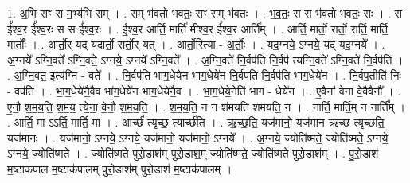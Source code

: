 \documentclass[17pt]{extarticle}
\begin{document}
1. अ॒भि सꣳ स म॒भ्य॑भि सम् । . सम् भ॑वतो भवतः॒ सꣳ सम् भ॑वतः । . भ॒व॒तः॒ स स भ॑वतो भवतः॒ सः । . स ई᳚श्व॒र ई᳚श्व॒रः स स ई᳚श्व॒रः । . ई॒श्व॒र आर्ति॒ मार्ति॑ मीश्व॒र ई᳚श्व॒र आर्ति᳚म् । . आर्ति॒ मार्तो॒ रार्तो॒ रार्ति॒ मार्ति॒ मार्तोः᳚ । . आर्तो॒र् यद् यदार्तो॒ रार्तो॒र् यत् । . आर्तो॒रित्या - अ॒र्तोः॒ । . यद॒ग्नये॒ ऽग्नये॒ यद् यद॒ग्नये᳚ । . अ॒ग्नये᳚ ऽग्नि॒वते᳚ ऽग्नि॒वते॒ ऽग्नये॒ ऽग्नये᳚ ऽग्नि॒वते᳚ । . अ॒ग्नि॒वते॑ नि॒र्वप॑ति नि॒र्वप॑ त्यग्नि॒वते᳚ ऽग्नि॒वते॑ नि॒र्वप॑ति । . अ॒ग्नि॒वत॒ इत्य॑ग्नि - वते᳚ । . नि॒र्वप॑ति भाग॒धेये॑न भाग॒धेये॑न नि॒र्वप॑ति नि॒र्वप॑ति भाग॒धेये॑न । . नि॒र्वप॒तीति॑ निः - वप॑ति । . भा॒ग॒धेये॑नै॒वैव भा॑ग॒धेये॑न भाग॒धेये॑नै॒व । . भा॒ग॒धेये॒नेति॑ भाग - धेये॑न । . ए॒वैना॑ वेना वे॒वैवैनौ᳚ । . ए॒नौ॒ श॒म॒य॒ति॒ श॒म॒य॒ त्ये॒ना॒ वे॒नौ॒ श॒म॒य॒ति॒ । . श॒म॒य॒ति॒ न न श॑मयति शमयति॒ न । . नार्ति॒ मार्ति॒म् न नार्ति᳚म् । . आर्ति॒ मा ऽऽर्ति॒ मार्ति॒ मा । . आर्च्छ॑ त्यृच्छ॒ त्यार्च्छ॑ति । . ऋ॒च्छ॒ति॒ यज॑मानो॒ यज॑मान ऋच्छ त्यृच्छति॒ यज॑मानः । . यज॑मानो॒ ऽग्नये॒ ऽग्नये॒ यज॑मानो॒ यज॑मानो॒ ऽग्नये᳚ । . अ॒ग्नये॒ ज्योति॑ष्मते॒ ज्योति॑ष्मते॒ ऽग्नये॒ ऽग्नये॒ ज्योति॑ष्मते । . ज्योति॑ष्मते पुरो॒डाश॑म् पुरो॒डाश॒म् ज्योति॑ष्मते॒ ज्योति॑ष्मते पुरो॒डाश᳚म् । . पु॒रो॒डाश॑ म॒ष्टाक॑पाल म॒ष्टाक॑पालम् पुरो॒डाश॑म् पुरो॒डाश॑ म॒ष्टाक॑पालम् । \newline
\end{document}
